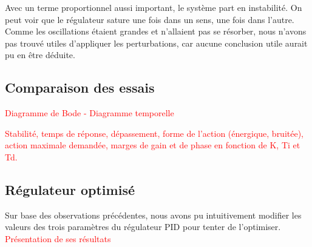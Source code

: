 Avec un terme proportionnel aussi important, le système part en instabilité.
On peut voir que le régulateur sature une fois dans un sens, une fois dans l'autre.
Comme les oscillations étaient grandes et n'allaient pas se résorber, nous
n'avons pas trouvé utiles d'appliquer les perturbations, car aucune conclusion
utile aurait pu en être déduite.


\subsection{Comparaison des essais}
\textcolor{red}{Diagramme de Bode - Diagramme temporelle\\}

\textcolor{red}{Stabilité, temps de réponse, dépassement, forme de l’action (énergique, bruitée), action maximale demandée, marges de gain et de phase en fonction de K, Ti et Td.}

\subsection{Régulateur optimisé}
Sur base des observations précédentes, nous avons pu intuitivement modifier les valeurs des trois paramètres du régulateur PID pour tenter de l'optimiser.\\

\textcolor{red}{Présentation de ses résultats}
